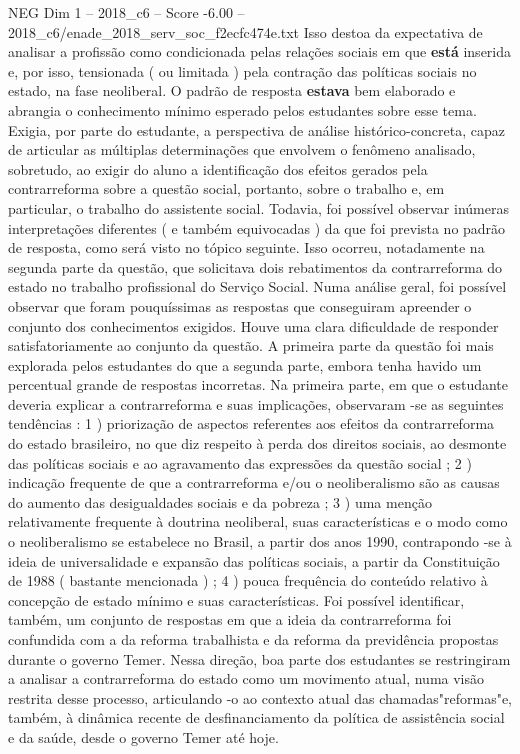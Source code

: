 \begin{textsample}{NEG Dim 1 – 2018\_c6 – Score -6.00 – 2018\_c6/enade\_2018\_serv\_soc\_f2ecfc474e.txt}
Isso destoa da expectativa de analisar a profissão como condicionada pelas relações sociais em que \textbf{está} inserida e, por isso, tensionada ( ou limitada ) pela contração das políticas sociais no estado, na fase neoliberal.
O padrão de resposta \textbf{estava} bem elaborado e abrangia o conhecimento mínimo esperado pelos estudantes sobre esse tema.
Exigia, por parte do estudante, a perspectiva de análise histórico-concreta, capaz de articular as múltiplas determinações que envolvem o fenômeno analisado, sobretudo, ao exigir do aluno a identificação dos efeitos gerados pela contrarreforma sobre a questão social, portanto, sobre o trabalho e, em particular, o trabalho do assistente social.
Todavia, foi possível observar inúmeras interpretações diferentes ( e também equivocadas ) da que foi prevista no padrão de resposta, como será visto no tópico seguinte.
Isso ocorreu, notadamente na segunda parte da questão, que solicitava dois rebatimentos da contrarreforma do estado no trabalho profissional do Serviço Social.
Numa análise geral, foi possível observar que foram pouquíssimas as respostas que conseguiram apreender o conjunto dos conhecimentos exigidos.
Houve uma clara dificuldade de responder satisfatoriamente ao conjunto da questão.
A primeira parte da questão foi mais explorada pelos estudantes do que a segunda parte, embora tenha havido um percentual grande de respostas incorretas.
Na primeira parte, em que o estudante deveria explicar a contrarreforma e suas implicações, observaram -se as seguintes tendências : 1 ) priorização de aspectos referentes aos efeitos da contrarreforma do estado brasileiro, no que diz respeito à perda dos direitos sociais, ao desmonte das políticas sociais e ao agravamento das expressões da questão social ; 2 ) indicação frequente de que a contrarreforma e/ou o neoliberalismo são as causas do aumento das desigualdades sociais e da pobreza ; 3 ) uma menção relativamente frequente à doutrina neoliberal, suas características e o modo como o neoliberalismo se estabelece no Brasil, a partir dos anos 1990, contrapondo -se à ideia de universalidade e expansão das políticas sociais, a partir da Constituição de 1988 ( bastante mencionada ) ; 4 ) pouca frequência do conteúdo relativo à concepção de estado mínimo e suas características.
Foi possível identificar, também, um conjunto de respostas em que a ideia da contrarreforma foi confundida com a da reforma trabalhista e da reforma da previdência propostas durante o governo Temer.
Nessa direção, boa parte dos estudantes se restringiram a analisar a contrarreforma do estado como um movimento atual, numa visão restrita desse processo, articulando -o ao contexto atual das chamadas"reformas"e, também, à dinâmica recente de desfinanciamento da política de assistência social e da saúde, desde o governo Temer até hoje.

\end{textsample}
